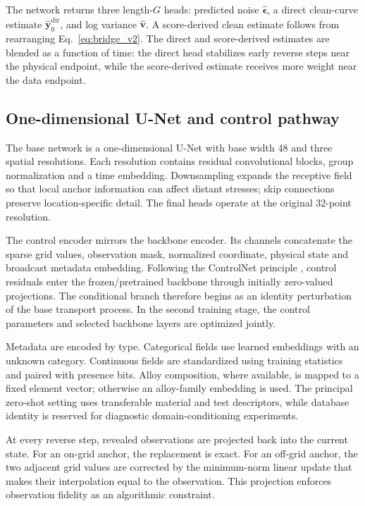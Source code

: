 \documentclass[a4paper,fleqn]{cas-dc}
\newcommand{\vect}[1]{\boldsymbol{#1}}
\begin{document}
The network returns three length-$G$ heads: predicted noise $\hat{\vect{\epsilon}}$, a direct clean-curve estimate $\hat{\vect{y}}_0^{\mathrm{dir}}$, and log variance $\hat{\vect{v}}$. A score-derived clean estimate follows from rearranging Eq.~\eqref{eq:bridge_v2}. The direct and score-derived estimates are blended as a function of time: the direct head stabilizes early reverse steps near the physical endpoint, while the score-derived estimate receives more weight near the data endpoint.

\subsection{One-dimensional U-Net and control pathway}

The base network is a one-dimensional U-Net with base width 48 and three spatial resolutions. Each resolution contains residual convolutional blocks, group normalization and a time embedding. Downsampling expands the receptive field so that local anchor information can affect distant stresses; skip connections preserve location-specific detail. The final heads operate at the original 32-point resolution.

The control encoder mirrors the backbone encoder. Its channels concatenate the sparse grid values, observation mask, normalized coordinate, physical state and broadcast metadata embedding. Following the ControlNet principle \cite{Zhang2023ControlNet}, control residuals enter the frozen/pretrained backbone through initially zero-valued projections. The conditional branch therefore begins as an identity perturbation of the base transport process. In the second training stage, the control parameters and selected backbone layers are optimized jointly.

Metadata are encoded by type. Categorical fields use learned embeddings with an unknown category. Continuous fields are standardized using training statistics and paired with presence bits. Alloy composition, where available, is mapped to a fixed element vector; otherwise an alloy-family embedding is used. The principal zero-shot setting uses transferable material and test descriptors, while database identity is reserved for diagnostic domain-conditioning experiments.

At every reverse step, revealed observations are projected back into the current state. For an on-grid anchor, the replacement is exact. For an off-grid anchor, the two adjacent grid values are corrected by the minimum-norm linear update that makes their interpolation equal to the observation. This projection enforces observation fidelity as an algorithmic constraint.
\end{document}
